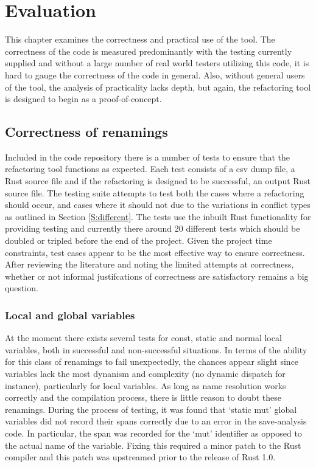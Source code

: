 \chapter{Evaluation}\label{C:eval}
This chapter examines the correctness and practical use of the tool. The correctness of the code is measured predominantly with the testing currently supplied and without a large number of real world testers utilizing this code, it is hard to gauge the correctness of the code in general. Also, without general users of the tool, the analysis of practicality lacks depth, but again, the refactoring tool is designed to begin as a proof-of-concept.


\section{Correctness of renamings}
Included in the code repository there is a number of tests to ensure that the refactoring tool functions as expected. Each test consists of a csv dump file, a Rust source file and if the refactoring is designed to be successful, an output Rust source file. The testing suite attempts to test both the cases where a refactoring should occur, and cases where it should not due to the variations in conflict types as outlined in Section \ref{S:different}. The tests use the inbuilt Rust functionality for providing testing and currently there around 20 different tests which should be doubled or tripled before the end of the project. Given the project time constraints, test cases appear to be the most effective way to ensure correctness. After reviewing the literature and noting the limited attempts at correctness, whether or not informal justifcations of correctness are satisfactory remains a big question.

\subsection{Local and global variables}
At the moment there exists several tests for const, static and normal local variables, both in successful and non-successful situations. In terms of the ability for this class of renamings to fail unexpectedly, the chances appear slight since variables lack the most dynanism and complexity (no dynamic dispatch for instance), particularly for local variables. As long as name resolution works correctly and the compilation process, there is little reason to doubt these renamings. During the process of testing, it was found that `static mut' global variables did not record their spans correctly due to an error in the save-analysis code. In particular, the span was recorded for the `mut' identifier as opposed to the actual name of the variable. Fixing this required a minor patch to the Rust compiler and this patch was upstreamed prior to the release of Rust 1.0.

